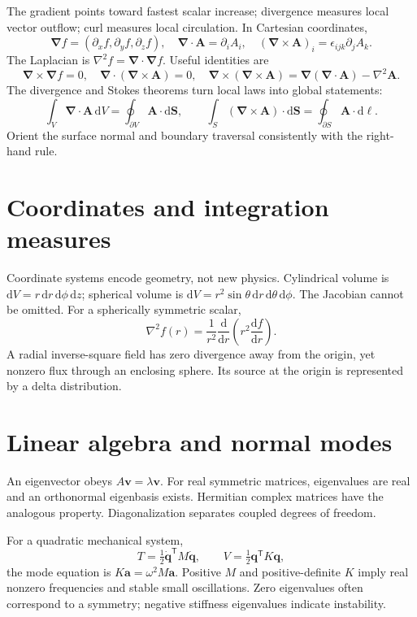 \documentclass[11pt,oneside]{book}
\newcommand{\dd}{\mathrm{d}}
\newcommand{\vect}[1]{\boldsymbol{#1}}
\newcommand{\grad}{\boldsymbol{\nabla}}
\newcommand{\lap}{\nabla^2}
\newcommand{\od}[2]{\frac{\dd #1}{\dd #2}}
\theoremstyle{reviewstyle}
\begin{document}
The gradient points toward fastest scalar increase; divergence measures local vector outflow; curl measures local circulation. In Cartesian coordinates,
\begin{equation}
\grad f=(\partial_xf,\partial_yf,\partial_zf),\quad
\grad\cdot\vect A=\partial_iA_i,\quad
(\grad\times\vect A)_i=\epsilon_{ijk}\partial_jA_k.
\end{equation}
The Laplacian is $\lap f=\grad\cdot\grad f$. Useful identities are
\begin{equation}
\grad\times\grad f=0,\quad \grad\cdot(\grad\times\vect A)=0,\quad
\grad\times(\grad\times\vect A)=\grad(\grad\cdot\vect A)-\lap\vect A.
\end{equation}
The divergence and Stokes theorems turn local laws into global statements:
\begin{equation}
\int_V\grad\cdot\vect A\,\dd V=\oint_{\partial V}\vect A\cdot\dd\vect S,
\qquad
\int_S(\grad\times\vect A)\cdot\dd\vect S=\oint_{\partial S}\vect A\cdot\dd\vect\ell.
\end{equation}
Orient the surface normal and boundary traversal consistently with the right-hand rule.
\section{Coordinates and integration measures}
Coordinate systems encode geometry, not new physics. Cylindrical volume is $\dd V=r\,\dd r\,\dd\phi\,\dd z$; spherical volume is $\dd V=r^2\sin\theta\,\dd r\,\dd\theta\,\dd\phi$. The Jacobian cannot be omitted. For a spherically symmetric scalar,
\begin{equation}
\lap f(r)=\frac{1}{r^2}\od{}{r}\left(r^2\od{f}{r}\right).
\end{equation}
A radial inverse-square field has zero divergence away from the origin, yet nonzero flux through an enclosing sphere. Its source at the origin is represented by a delta distribution.
\section{Linear algebra and normal modes}
An eigenvector obeys $A\vect v=\lambda\vect v$. For real symmetric matrices, eigenvalues are real and an orthonormal eigenbasis exists. Hermitian complex matrices have the analogous property. Diagonalization separates coupled degrees of freedom.

For a quadratic mechanical system,
\begin{equation}
T=\tfrac12\dot{\vect q}^{\mathsf T}M\dot{\vect q},\qquad
V=\tfrac12\vect q^{\mathsf T}K\vect q,
\end{equation}
the mode equation is $K\vect a=\omega^2M\vect a$. Positive $M$ and positive-definite $K$ imply real nonzero frequencies and stable small oscillations. Zero eigenvalues often correspond to a symmetry; negative stiffness eigenvalues indicate instability.
\end{document}
